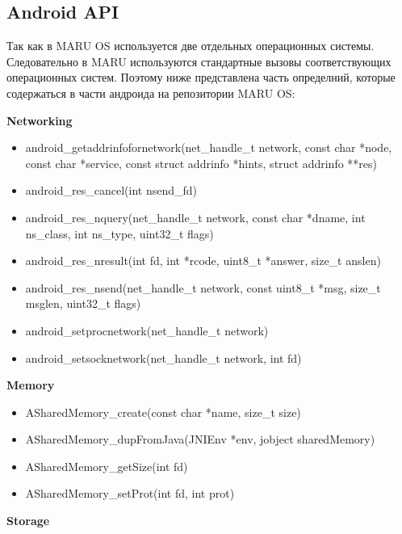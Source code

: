 \documentclass[a4paper, 14pt]{article}
\begin{document}
\subsection{Android API}
\par Так как в MARU OS используется две отдельных операционных системы. Следовательно в MARU используются стандартные вызовы соответствующих операционных систем. Поэтому ниже представлена часть определний, которые содержаться в части андроида на репозитории MARU OS:

\textbf{Networking}

\begin{itemize}
    \item android\_getaddrinfofornetwork(net\_handle\_t network, const char *node, const char *service, const struct addrinfo *hints, struct addrinfo **res)
    \item android\_res\_cancel(int nsend\_fd)
    \item android\_res\_nquery(net\_handle\_t network, const char *dname, int ns\_class, int ns\_type, uint32\_t flags)
    \item android\_res\_nresult(int fd, int *rcode, uint8\_t *answer, size\_t anslen)
    \item android\_res\_nsend(net\_handle\_t network, const uint8\_t *msg, size\_t msglen, uint32\_t flags)
    \item android\_setprocnetwork(net\_handle\_t network)
    \item android\_setsocknetwork(net\_handle\_t network, int fd)
\end{itemize}

\textbf{Memory}

\begin{itemize}
    \item ASharedMemory\_create(const char *name, size\_t size)
    \item ASharedMemory\_dupFromJava(JNIEnv *env, jobject sharedMemory)
    \item ASharedMemory\_getSize(int fd)
    \item ASharedMemory\_setProt(int fd, int prot)
\end{itemize}

\textbf{Storage}
\end{document}
